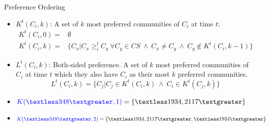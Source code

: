 \documentclass{beamer}
\begin{document}
\begin{frame}{Preference Ordering}
    \footnotesize
    \begin{itemize}
        \item {\color{blue}$K^t(C_i, k)$:} A set of $k$ most preferred communities of $C_i$ at time $t$:
            \footnotesize
            \begin{equation*}\label{h_t_pref_top}
                \begin{split}				
                    K^t(C_i, 0) = &\emptyset \\
                    K^t(C_i, k) = &\Big\{C_x | C_x \geq_{i}^t C_y ~\forall C_y \in CS ~\wedge~ C_x \neq C_y ~\wedge~ C_y \notin K^t(C_i, k-1) \Big\}				
                \end{split}
            \end{equation*}
        \item {\color{blue}$L^t(C_i,k)$:} Both-sided preference. A set of $k$ most preferred communities of $C_i$ at time $t$ which they also have $C_i$ as their most $k$ preferred communities.
            \footnotesize
            \begin{equation*}\label{l_t_top_both}
                L^t(C_i,k) = \Big\{C_j | C_j \in K^t(C_i, k)~ \wedge~ C_i \in K^t(C_j, k)\Big\}
            \end{equation*}
        
        \item ${\color{blue}K(\textless 348 \textgreater, 1)} = \{\textless1934, 2117\textgreater\}$
        \item ${\color{blue}K(\textless 348 \textgreater, 2)} = \{\textless1934, 2117\textgreater, \textless1934\textgreater\}$

    \end{itemize}
\end{frame}
\end{document}
